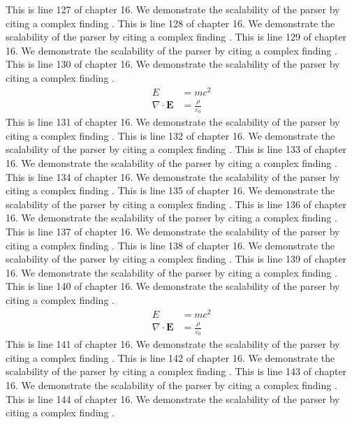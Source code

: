 This is line 127 of chapter 16. We demonstrate the scalability of the parser by citing a complex finding \cite{ref16_127}.
This is line 128 of chapter 16. We demonstrate the scalability of the parser by citing a complex finding \cite{ref16_128}.
This is line 129 of chapter 16. We demonstrate the scalability of the parser by citing a complex finding \cite{ref16_129}.
This is line 130 of chapter 16. We demonstrate the scalability of the parser by citing a complex finding \cite{ref16_130}.
\begin{align*}
  E &= mc^2 \\
  \nabla \cdot \mathbf{E} &= \frac{\rho}{\varepsilon_0}
\end{align*}
This is line 131 of chapter 16. We demonstrate the scalability of the parser by citing a complex finding \cite{ref16_131}.
This is line 132 of chapter 16. We demonstrate the scalability of the parser by citing a complex finding \cite{ref16_132}.
This is line 133 of chapter 16. We demonstrate the scalability of the parser by citing a complex finding \cite{ref16_133}.
This is line 134 of chapter 16. We demonstrate the scalability of the parser by citing a complex finding \cite{ref16_134}.
This is line 135 of chapter 16. We demonstrate the scalability of the parser by citing a complex finding \cite{ref16_135}.
This is line 136 of chapter 16. We demonstrate the scalability of the parser by citing a complex finding \cite{ref16_136}.
This is line 137 of chapter 16. We demonstrate the scalability of the parser by citing a complex finding \cite{ref16_137}.
This is line 138 of chapter 16. We demonstrate the scalability of the parser by citing a complex finding \cite{ref16_138}.
This is line 139 of chapter 16. We demonstrate the scalability of the parser by citing a complex finding \cite{ref16_139}.
This is line 140 of chapter 16. We demonstrate the scalability of the parser by citing a complex finding \cite{ref16_140}.
\begin{align*}
  E &= mc^2 \\
  \nabla \cdot \mathbf{E} &= \frac{\rho}{\varepsilon_0}
\end{align*}
This is line 141 of chapter 16. We demonstrate the scalability of the parser by citing a complex finding \cite{ref16_141}.
This is line 142 of chapter 16. We demonstrate the scalability of the parser by citing a complex finding \cite{ref16_142}.
This is line 143 of chapter 16. We demonstrate the scalability of the parser by citing a complex finding \cite{ref16_143}.
This is line 144 of chapter 16. We demonstrate the scalability of the parser by citing a complex finding \cite{ref16_144}.
